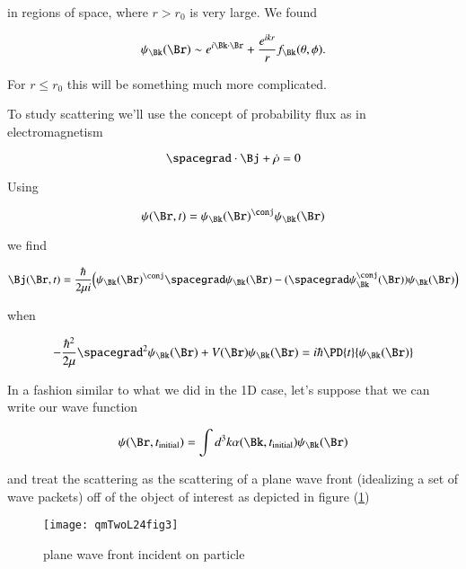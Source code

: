 in regions of space, where $r > r_0$ is very large.  We found

\begin{equation}\label{eqn:qmTwoL24:30}
\psi_\Bk(\Br) \sim e^{i \Bk \cdot \Br} + \frac{e^{i k r}}{r} f_\Bk(\theta, \phi).
\end{equation}

For $r \le r_0$ this will be something much more complicated.

To study scattering we'll use the concept of probability flux as in electromagnetism

\begin{equation}\label{eqn:qmTwoL24:50}
\spacegrad \cdot \Bj + \dot{\rho} = 0
\end{equation}

Using

\begin{equation}\label{eqn:qmTwoL24:70}
\psi(\Br, t) =
\psi_\Bk(\Br)^\conj
\psi_\Bk(\Br)
\end{equation}

we find

\begin{equation}\label{eqn:qmTwoL24:90}
\Bj(\Br, t) = \frac{\hbar}{2 \mu i} \Bigl(
\psi_\Bk(\Br)^\conj \spacegrad \psi_\Bk(\Br)
- (\spacegrad \psi_\Bk^\conj(\Br)) \psi_\Bk(\Br)
\Bigr)
\end{equation}

when

\begin{equation}\label{eqn:qmTwoL24:110}
-\frac{\hbar^2}{2\mu} \spacegrad^2
\psi_\Bk(\Br)
+ V(\Br)
\psi_\Bk(\Br)
=
i \hbar \PD{t}{
\psi_\Bk(\Br)
}
\end{equation}

In a fashion similar to what we did in the 1D case, let's suppose that we can write our wave function

\begin{equation}\label{eqn:qmTwoL24:130}
\psi(\Br, t_{\text{initial}}) = \int d^3k \alpha(\Bk, t_{\text{initial}}) \psi_\Bk(\Br)
\end{equation}

and treat the scattering as the scattering of a plane wave front (idealizing a set of wave packets) off of the object of interest as depicted in figure (\ref{fig:qmTwoL24:qmTwoL24fig3})

\begin{figure}[htp]
   \centering
   \texttt{[image: qmTwoL24fig3]}
   \caption{plane wave front incident on particle}\label{fig:qmTwoL24:qmTwoL24fig3}
\end{figure}


